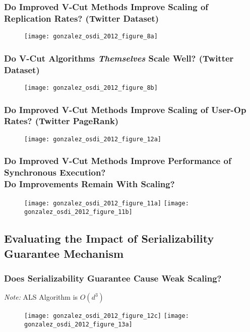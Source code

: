 \begin{frame}
  \frametitle{\small{Do Improved V-Cut Methods Improve Scaling of Replication
              Rates? (Twitter Dataset)}}
  \centering
  \begin{figure}
    \texttt{[image: gonzalez\_osdi\_2012\_figure\_8a]}
    \caption{\cite[OSDI '12]{gonzalez2012powergraph}}
  \end{figure}
\end{frame}

\begin{frame}
  \frametitle{\small Do V-Cut Algorithms \textit{Themselves} Scale Well?
              (Twitter Dataset)}
  \centering
  \begin{figure}
    \texttt{[image: gonzalez\_osdi\_2012\_figure\_8b]}
    \caption{\cite[OSDI '12]{gonzalez2012powergraph}}
  \end{figure}
\end{frame}

\begin{frame}
  \frametitle{\small Do Improved V-Cut Methods Improve Scaling of User-Op Rates?
              (Twitter PageRank)}
  \centering
  \begin{figure}
    \texttt{[image: gonzalez\_osdi\_2012\_figure\_12a]}
    \caption{\cite[OSDI '12]{gonzalez2012powergraph}}
  \end{figure}
\end{frame}

\begin{frame}
  \frametitle{\small Do Improved V-Cut Methods Improve Performance of
              Synchronous Execution?\\
              Do Improvements Remain With Scaling?}
  \centering
  \begin{figure}
    \texttt{[image: gonzalez\_osdi\_2012\_figure\_11a]}%
    \texttt{[image: gonzalez\_osdi\_2012\_figure\_11b]}
    \caption{\cite[OSDI '12]{gonzalez2012powergraph}}
  \end{figure}
\end{frame}


\subsection{Evaluating the Impact of Serializability Guarantee Mechanism}

\begin{frame}
  \frametitle{\small Does Serializability Guarantee Cause Weak Scaling?}
  \centering
  \textit{Note:} ALS Algorithm is $O(d^3)$
  \begin{figure}
    \texttt{[image: gonzalez\_osdi\_2012\_figure\_12c]}%
    \texttt{[image: gonzalez\_osdi\_2012\_figure\_13a]}
    \caption{\cite[OSDI '12]{gonzalez2012powergraph}}
  \end{figure}
\end{frame}


